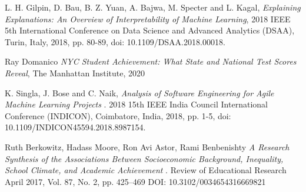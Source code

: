 \documentclass[sigconf,nonacm,11pt]{acmart}
\begin{document}
\begin{thebibliography}{9}
L. H. Gilpin, D. Bau, B. Z. Yuan, A. Bajwa, M. Specter and L. Kagal, 
\textit{Explaining Explanations: An Overview of Interpretability of Machine Learning}, 2018 IEEE 5th International Conference on Data Science and Advanced Analytics (DSAA), Turin, Italy, 2018, pp. 80-89, doi: 10.1109/DSAA.2018.00018.


Ray Domanico
\textit{NYC Student Achievement: What State and National Test Scores Reveal}, 
The Manhattan Institute, 2020

K. Singla, J. Bose and C. Naik, 
\textit{Analysis of Software Engineering for Agile Machine Learning Projects }.
2018 15th IEEE India Council International Conference (INDICON), Coimbatore, India, 2018, pp. 1-5, doi: 10.1109/INDICON45594.2018.8987154.

Ruth Berkowitz, Hadass Moore, Ron Avi Astor, Rami Benbenishty
\textit{A Research Synthesis of the Associations Between Socioeconomic Background, Inequality, School Climate, and Academic Achievement }.
Review of Educational Research April 2017, Vol. 87, No. 2, pp. 425–469 DOI: 10.3102/0034654316669821






\end{thebibliography}




\appendix

\end{document}
